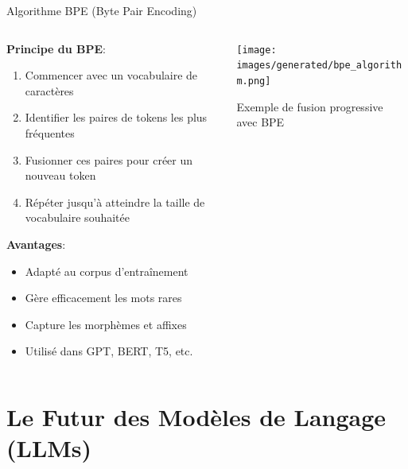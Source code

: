 \documentclass[aspectratio=169,11pt]{beamer}
\begin{document}
\begin{frame}{Algorithme BPE (Byte Pair Encoding)}
    \begin{columns}
        \begin{column}{0.45\textwidth}
            \textbf{Principe du BPE}:
            \begin{enumerate}
                \item Commencer avec un vocabulaire de caractères
                \item Identifier les paires de tokens les plus fréquentes
                \item Fusionner ces paires pour créer un nouveau token
                \item Répéter jusqu'à atteindre la taille de vocabulaire souhaitée
            \end{enumerate}
            \vspace{0.3cm}
            \textbf{Avantages}:
            \begin{itemize}
                \item Adapté au corpus d'entraînement
                \item Gère efficacement les mots rares
                \item Capture les morphèmes et affixes
                \item Utilisé dans GPT, BERT, T5, etc.
            \end{itemize}
        \end{column}
        \begin{column}{0.55\textwidth}
            \texttt{[image: images/generated/bpe\_algorithm.png]}
            \vspace{0.2cm}
            \begin{center}
                \small{Exemple de fusion progressive avec BPE}
            \end{center}
        \end{column}
    \end{columns}
\end{frame}

\section{Le Futur des Modèles de Langage (LLMs)}
\end{document}
